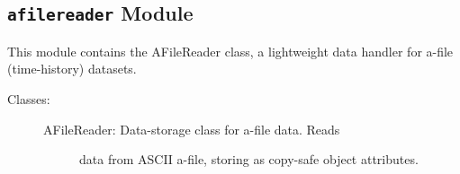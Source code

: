 \documentclass[letterpaper,10pt,english]{sphinxmanual}
\begin{document}
\subsection{\texttt{afilereader} Module}
\label{eqtools:afilereader-module}\label{eqtools:module-eqtools.afilereader}
This module contains the AFileReader class, a lightweight data
handler for a-file (time-history) datasets.
\begin{description}
\item[{Classes:}] \leavevmode\begin{description}
\item[{AFileReader: Data-storage class for a-file data.  Reads}] \leavevmode
data from ASCII a-file, storing as copy-safe object
attributes.

\end{description}

\end{description}
\end{document}
